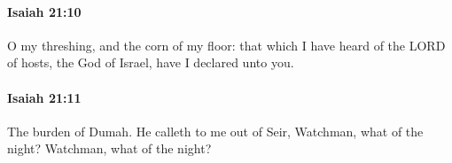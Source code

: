 		\paragraph{Isaiah 21:10} %
			\label{ISAIAH-21-10}

			O my threshing, and the corn of my floor: that which I have heard of the LORD of hosts, the God of Israel, have I declared unto you.


		\paragraph{Isaiah 21:11} %
			\label{ISAIAH-21-11}

			The burden of Dumah. He calleth to me out of Seir, Watchman, what of the night? Watchman, what of the night?


